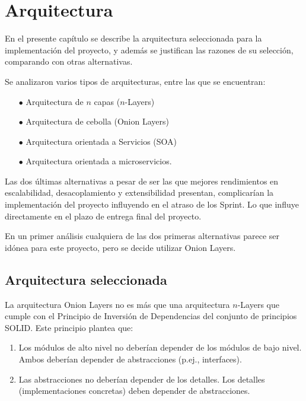\chapter{Arquitectura}

En el presente capítulo se describe la arquitectura seleccionada para la implementación del proyecto, y además se justifican las razones de su selección, comparando con otras alternativas.

Se analizaron varios tipos de arquitecturas, entre las que se encuentran:

\begin{enumerate}
    \item[$\bullet$] Arquitectura de $n$ capas ($n$-Layers)
    \item[$\bullet$] Arquitectura de cebolla (Onion Layers)
    \item[$\bullet$] Arquitectura orientada a Servicios (SOA)
    \item[$\bullet$] Arquitectura orientada a microservicios.
\end{enumerate}

Las dos últimas alternativas a pesar de ser las que mejores rendimientos en escalabilidad, desacoplamiento y extensibilidad presentan, complicarían la implementación del proyecto influyendo en el atraso de los Sprint. Lo que influye directamente en el plazo de entrega final del proyecto.

En un primer análisis cualquiera de las dos primeras alternativas parece ser idónea para este proyecto, pero se decide utilizar Onion Layers.

\section{Arquitectura seleccionada}\label{sec:arch}

La arquitectura Onion Layers no es más que una arquitectura $n$-Layers que cumple con el Principio de Inversión de Dependencias del conjunto de principios SOLID. Este principio plantea que:

\begin{enumerate}
    \item Los módulos de alto nivel no deberían depender de los módulos de bajo nivel. Ambos deberían depender de abstracciones (p.ej., interfaces).
    \item Las abstracciones no deberían depender de los detalles. Los detalles (implementaciones concretas) deben depender de abstracciones.
\end{enumerate}

